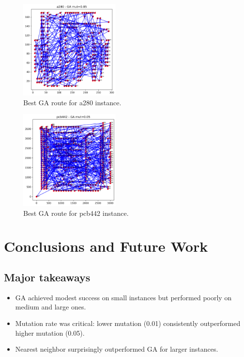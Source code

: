 \documentclass[conference]{IEEEtran}
\begin{document}
\begin{figure}[h]
    \centering
    \includegraphics[width=0.45\textwidth]{figures/a280_ga_mut0.05.png}
    \caption{Best GA route for a280 instance.}
    \label{fig:route280}
\end{figure}

\begin{figure}[h]
    \centering
    \includegraphics[width=0.45\textwidth]{figures/pcb442_ga_mut0.05.png}
    \caption{Best GA route for pcb442 instance.}
    \label{fig:route280}
\end{figure}

\section{Conclusions and Future Work}
\subsection{Major takeaways}
\begin{itemize}
    \item GA achieved modest success on small instances but performed poorly on medium and large ones.
    \item Mutation rate was critical: lower mutation (0.01) consistently outperformed higher mutation (0.05).
    \item Nearest neighbor surprisingly outperformed GA for larger instances.
\end{itemize}
\end{document}

